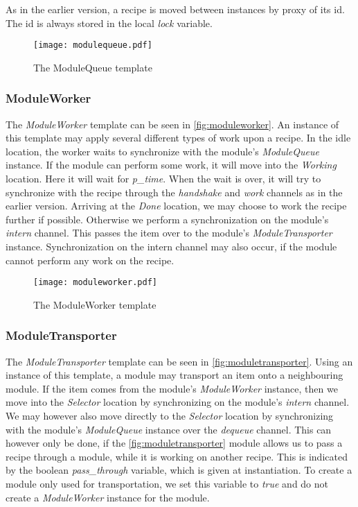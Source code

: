 As in the earlier version, a recipe is moved between instances by proxy of its id. The id is always stored in the local \emph{lock} variable.   

\begin{figure}[h]
\centering
\texttt{[image: modulequeue.pdf]}
\caption{The ModuleQueue template}
\label{fig:modulequeue}
\end{figure}


\subsubsection{ModuleWorker}\label{subs:moduleworker}
The \emph{ModuleWorker} template can be seen in \cref{fig:moduleworker}. An instance of this template may apply several different types of work upon a recipe. In the idle location, the worker waits to synchronize with the module's \emph{ModuleQueue} instance. If the module can perform some work, it will move into the \emph{Working} location. Here it will wait for \emph{p\_time}. When the wait is over, it will try to synchronize with the recipe through the \emph{handshake} and \emph{work} channels as in the earlier version. Arriving at the \emph{Done} location, we may choose to work the recipe further if possible. Otherwise we perform a synchronization on the module's \emph{intern} channel. This passes the item over to the module's \emph{ModuleTransporter} instance. Synchronization on the intern channel may also occur, if the module cannot perform any work on the recipe. 

\begin{figure}[h]
\centering
\texttt{[image: moduleworker.pdf]}
\caption{The ModuleWorker template}
\label{subs:recipe}
\end{figure}

\subsubsection{ModuleTransporter}
The \emph{ModuleTransporter} template can be seen in \cref{fig:moduletransporter}. Using an instance of this template, a module may transport an item onto a neighbouring module. If the item comes from the module's \emph{ModuleWorker} instance, then we move into the \emph{Selector} location by synchronizing on the module's \emph{intern} channel. We may however also move directly to the \emph{Selector} location by synchronizing with the module's \emph{ModuleQueue} instance over the \emph{dequeue} channel. This can however only be done, if the \cref{fig:moduletransporter} module allows us to pass a recipe through a module, while it is working on another recipe. This is indicated by the boolean \emph{pass\_through} variable, which is given at instantiation. To create a module only used for transportation, we set this variable to \emph{true} and do not create a \emph{ModuleWorker} instance for the module. 

